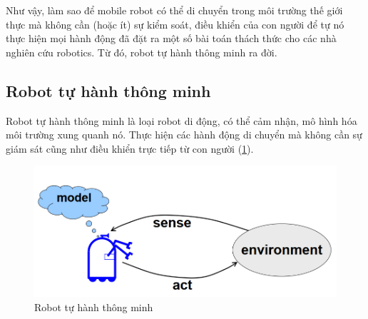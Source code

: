 Như vậy, làm sao để mobile robot có thể di chuyển trong môi trường thế giới thực mà không cần (hoặc ít) sự kiểm soát, điều khiển của con người để tự nó thực hiện mọi hành động đã đặt ra một số bài toán thách thức cho các nhà nghiên cứu robotics.
Từ đó, robot tự hành thông minh ra đời. 

\subsection{Robot tự hành thông minh}
Robot tự hành thông minh là loại robot di động, có thể cảm nhận, mô hình hóa môi trường xung quanh nó. Thực hiện các hành động di chuyển mà không cần sự giám sát cũng như điều khiển trực tiếp từ con người (\figurename{\ref{fig:intro}}).

\begin{figure}
	\centering
	\includegraphics[width=13cm]{chapter1/figs/intro.png}
	\caption{Robot tự hành thông minh}
	\label{fig:intro}
\end{figure}

